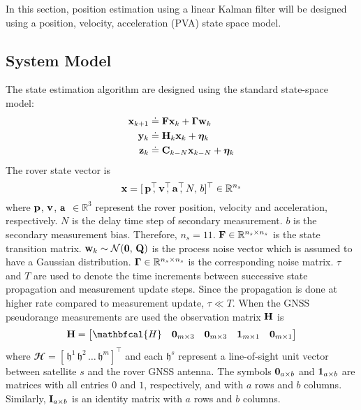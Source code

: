 In this section, position estimation using a linear Kalman filter will be designed using a position, velocity, acceleration (PVA) state space model.

\subsection{System Model}
The state estimation algorithm are designed using the standard state-space model:
\begin{align} \label{eqn:state_prop_model}
	\mathbf{x}_{k+1} &\doteq \mathbf{F} \mathbf{x}_k + \boldsymbol{\Gamma} \mathbf{w}_k \\
	\label{eqn:msr_update_model}
	\mathbf{y}_k &\doteq \mathbf{H}_k \mathbf{x}_k + \boldsymbol{\eta}_k \\
	\label{eqn:delayed_msr_update_model}
	\mathbf{z}_k &\doteq \mathbf{C}_{k-N} \mathbf{x}_{k-N} + \boldsymbol{\eta}_k	
\end{align} 
The rover state vector is 
\begin{equation} \label{eqn:state_vector}
	\Boldx = [\,\Boldp^\top \!\!\!, \, \Boldv^\top \!\!\!, \, \Bolda^\top \!\!\!, \, N, \, b]^\top 
	\in \mathbb{R}^{n_s}
\end{equation}
where $\mathbf{p}$, $\mathbf{v}$, $\mathbf{a}$ $\in \mathbb{R}^3$ represent the rover position, velocity and acceleration, respectively. $N$ is the delay time step of secondary measurement. $b$ is the secondary measurement bias. 
Therefore, $n_s = 11$. $\mathbf{F} \in \mathbb{R}^{n_s \times n_s}$ is the state transition matrix.
$\mathbf{w}_k \sim \mathcal{N}(\boldsymbol{0},\,\mathbf{Q})$ is the process noise vector which is assumed to have a Gaussian distribution. $\boldsymbol{\Gamma} \in \mathbb{R}^{n_s \times n_s}$ is the corresponding noise matrix. $\tau$ and $T$ are used to denote the time increments between successive state propagation and measurement update steps. 
Since the propagation is done at higher rate compared to measurement update, $\tau \ll T$.
When the GNSS pseudorange measurements are used the observation matrix $\mathbf{H}$ is
\begin{equation}
	\BoldH = \begin{bmatrix}		
		\mathbfcal{H} & \0_{m \times 3} & \0_{m \times 3} & \1_{m \times 1} & \0_{m \times 1} \\		
	\end{bmatrix}
\end{equation}
where $\mathbfcal{H} = [\, \mathfrak{h}^1 \, \mathfrak{h}^2 \, \dots \, \mathfrak{h}^m ]^\top$ and each $\mathfrak{h}^s$ represent a line-of-sight unit vector between satellite $s$ and the rover GNSS antenna. 
The symbols $\boldsymbol{0}_{a \times b}$ and $\boldsymbol{1}_{a \times b}$ are  matrices with all entries $0$ and $1$, respectively, and with $a$ rows and $b$ columns. 
Similarly, $\mathbf{I}_{a \times b}$ is an identity matrix with $a$ rows and $b$ columns.

